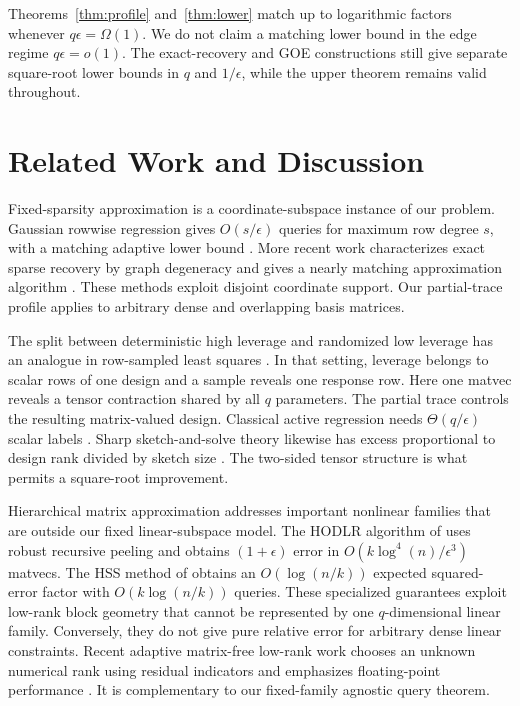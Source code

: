 \documentclass[twoside]{article}
\begin{document}
Theorems~\ref{thm:profile} and~\ref{thm:lower} match up to logarithmic factors whenever $q\epsilon=\Omega(1)$. We do not claim a matching lower bound in the edge regime $q\epsilon=o(1)$. The exact-recovery and GOE constructions still give separate square-root lower bounds in $q$ and $1/\epsilon$, while the upper theorem remains valid throughout.

\section{Related Work and Discussion}

Fixed-sparsity approximation is a coordinate-subspace instance of our problem. Gaussian rowwise regression gives $O(s/\epsilon)$ queries for maximum row degree $s$, with a matching adaptive lower bound \citep{amsel2026fixed}. More recent work characterizes exact sparse recovery by graph degeneracy and gives a nearly matching approximation algorithm \citep{musco2026instance}. These methods exploit disjoint coordinate support. Our partial-trace profile applies to arbitrary dense and overlapping basis matrices.

The split between deterministic high leverage and randomized low leverage has an analogue in row-sampled least squares \citep{larsen2020practical,larsen2026revisiting}. In that setting, leverage belongs to scalar rows of one design and a sample reveals one response row. Here one matvec reveals a tensor contraction shared by all $q$ parameters. The partial trace controls the resulting matrix-valued design. Classical active regression needs $\Theta(q/\epsilon)$ scalar labels \citep{chen2019active}. Sharp sketch-and-solve theory likewise has excess proportional to design rank divided by sketch size \citep{epperly2026sharp}. The two-sided tensor structure is what permits a square-root improvement.

Hierarchical matrix approximation addresses important nonlinear families that are outside our fixed linear-subspace model. The HODLR algorithm of \citet{chen2025hodlr} uses robust recursive peeling and obtains $(1+\epsilon)$ error in $O(k\log^4(n)/\epsilon^3)$ matvecs. The HSS method of \citet{amsel2026hss} obtains an $O(\log(n/k))$ expected squared-error factor with $O(k\log(n/k))$ queries. These specialized guarantees exploit low-rank block geometry that cannot be represented by one $q$-dimensional linear family. Conversely, they do not give pure relative error for arbitrary dense linear constraints. Recent adaptive matrix-free low-rank work chooses an unknown numerical rank using residual indicators and emphasizes floating-point performance \citep{smith2026adaptive}. It is complementary to our fixed-family agnostic query theorem.
\end{document}

